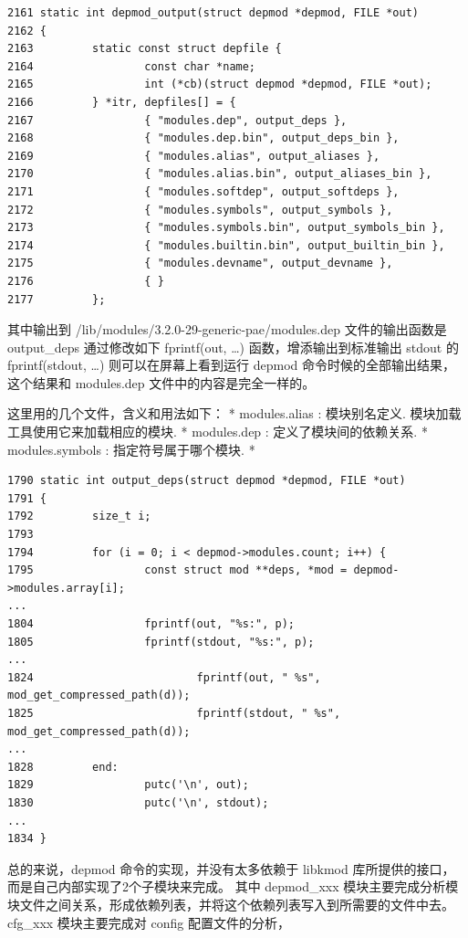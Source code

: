 {\begin{shaded}\begin{verbatim}
2161 static int depmod_output(struct depmod *depmod, FILE *out)
2162 {
2163         static const struct depfile {
2164                 const char *name;
2165                 int (*cb)(struct depmod *depmod, FILE *out);
2166         } *itr, depfiles[] = {
2167                 { "modules.dep", output_deps },
2168                 { "modules.dep.bin", output_deps_bin },
2169                 { "modules.alias", output_aliases },
2170                 { "modules.alias.bin", output_aliases_bin },
2171                 { "modules.softdep", output_softdeps },
2172                 { "modules.symbols", output_symbols },
2173                 { "modules.symbols.bin", output_symbols_bin },
2174                 { "modules.builtin.bin", output_builtin_bin },
2175                 { "modules.devname", output_devname },
2176                 { }
2177         };
\end{verbatim}\end{shaded}}
其中输出到 /lib/modules/3.2.0-29-generic-pae/modules.dep
文件的输出函数是 output\_deps 通过修改如下 fprintf(out, \ldots{})
函数，增添输出到标准输出 stdout 的 fprintf(stdout, \ldots{})
则可以在屏幕上看到运行 depmod 命令时候的全部输出结果，这个结果和
modules.dep 文件中的内容是完全一样的。

这里用的几个文件，含义和用法如下： * modules.alias : 模块别名定义.
模块加载工具使用它来加载相应的模块. * modules.dep :
定义了模块间的依赖关系. * modules.symbols : 指定符号属于哪个模块. *

{\begin{shaded}\begin{verbatim}
1790 static int output_deps(struct depmod *depmod, FILE *out)
1791 {
1792         size_t i;
1793 
1794         for (i = 0; i < depmod->modules.count; i++) {
1795                 const struct mod **deps, *mod = depmod->modules.array[i];
...
1804                 fprintf(out, "%s:", p);
1805                 fprintf(stdout, "%s:", p);
...
1824                         fprintf(out, " %s", mod_get_compressed_path(d));
1825                         fprintf(stdout, " %s", mod_get_compressed_path(d));
...
1828         end:
1829                 putc('\n', out);
1830                 putc('\n', stdout);
... 
1834 }
\end{verbatim}\end{shaded}}
总的来说，depmod 命令的实现，并没有太多依赖于 libkmod
库所提供的接口，而是自己内部实现了2个子模块来完成。 其中 depmod\_xxx
模块主要完成分析模块文件之间关系，形成依赖列表，并将这个依赖列表写入到所需要的文件中去。
cfg\_xxx 模块主要完成对 config 配置文件的分析，

